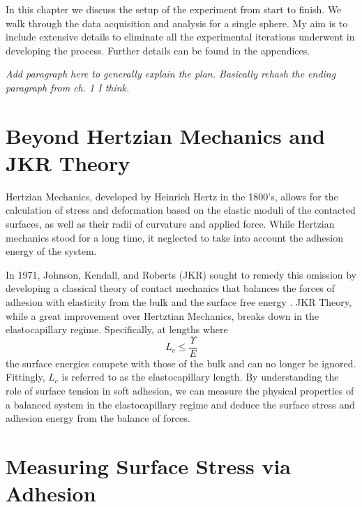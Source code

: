 In this chapter we discuss the setup of the experiment from start to finish. We walk through the data acquisition and analysis for a single sphere. My aim is to include extensive details to eliminate all the experimental iterations underwent in developing the process. Further details can be found in the appendices.

\emph{Add paragraph here to generally explain the plan. Basically rehash the ending paragraph from ch. 1 I think.}

\section{Beyond Hertzian Mechanics and JKR Theory}

Hertzian Mechanics, developed by Heinrich Hertz in the 1800's, allows for the calculation of stress and deformation based on the elastic moduli of the contacted surfaces, as well as their radii of curvature and applied force. While Hertzian mechanics stood for a long time, it neglected to take into account the adhesion energy of the system.  

In 1971, Johnson, Kendall, and Roberts (JKR) sought to remedy this omission by developing a classical theory of contact mechanics that balances the forces of adhesion with elasticity from the bulk and the surface free energy {\cite{johnson1971surface}}.
JKR Theory, while a great improvement over Hertztian Mechanics, breaks down in the elastocapillary regime. Specifically, at lengths where 
\begin{equation}
\label{EC_regime}
L_{c} \leq \frac{\Upsilon}{E}
\end{equation}
the surface energies compete with those of the bulk and can no longer be ignored. Fittingly, $L_c$ is referred to as the elastocapillary length. By understanding the role of surface tension in soft adhesion, we can measure the physical properties of a balanced system in the elastocapillary regime and deduce the surface stress and adhesion energy from the balance of forces.


\section{Measuring Surface Stress via Adhesion}
